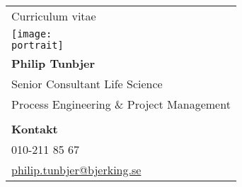 \documentclass[a4paper, 10pt]{article}
\makeatletter
\newcommand{\unitdetail}{Process Engineering \& Project Management} %
\newcommand{\name}{Philip Tunbjer} %
\newcommand{\role}{Senior Consultant Life Science} %
\newcommand{\phone}{010-211 85 67} %
\newcommand{\email}{philip.tunbjer@bjerking.se} %
\newcommand{\portrait}{img/portrait.png} %
\makeatother
\begin{document}
\thispagestyle{presentation}
\noindent
\begin{minipage}[t]{0.3\textwidth}
    \strut\vspace*{-\baselineskip}\newline
    \begin{tabular*}{1\linewidth}{p{1\linewidth}}
        {\LARGE Curriculum vitae}\\
        \texttt{[image: \\portrait]} \\
        \textbf{\name} \\
        \role{} \\
        \unitdetail{} \\
        \\
        \textbf{Kontakt} \\
        \phone{} \\
        \href{mailto:\email}{\email} \\
    \end{tabular*}
\end{minipage}%
\hfill
\end{document}
